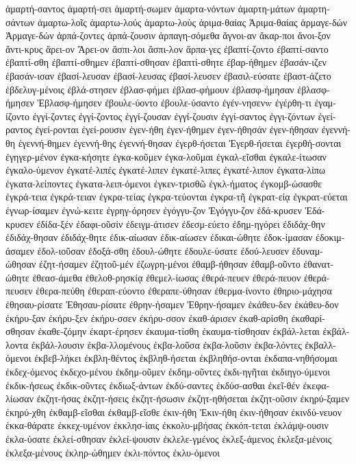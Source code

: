 {ἁμαρτή-σαντος
ἁμαρτή-σει
ἁμαρτή-σωμεν
ἁμαρτα-νόντων
ἁμαρτη-μάτων
ἁμαρτη-σάντων
ἁμαρτω-λοῖς
ἁμαρτω-λούς
ἁμαρτω-λοὺς
ἁριμα-θαίας
Ἁριμα-θαίας
ἁρμαγε-δών
Ἁρμαγε-δών
ἁρπά-ζοντες
ἁρπά-ζουσιν
ἁρπαγη-σόμεθα
ἄγνοι-αν
ἄκαρ-ποι
ἄνοι-ξον
ἄντι-κρυς
ἄρει-ον
Ἄρει-ον
ἄσπι-λοι
ἄσπι-λον
ἅρπα-γες
ἐβαπτί-ζοντο
ἐβαπτί-σαντο
ἐβαπτί-σθη
ἐβαπτί-σθημεν
ἐβαπτί-σθησαν
ἐβαπτί-σθητε
ἐβαρ-ήθημεν
ἐβασάν-ιζεν
ἐβασάν-ισαν
ἐβασί-λευσαν
ἐβασί-λευσας
ἐβασί-λευσεν
ἐβασιλ-εύσατε
ἐβαστ-άζετο
ἐβδελυγ-μένοις
ἐβλά-στησεν
ἐβλασ-φήμει
ἐβλασ-φήμουν
ἐβλασφ-ήμησαν
ἐβλασφ-ήμησεν
Ἐβλασφ-ήμησεν
ἐβουλε-ύοντο
ἐβουλε-ύσαντο
ἐγέν-νησενw
ἐγέρθη-τι
ἐγαμ-ίζοντο
ἐγγί-ζοντες
ἐγγί-ζοντος
ἐγγί-ζουσαν
ἐγγί-ζουσιν
ἐγγί-σαντος
ἐγγι-ζόντων
ἐγεί-ραντος
ἐγεί-ρονται
ἐγεί-ρουσιν
ἐγεν-ήθη
ἐγεν-ήθημεν
ἐγεν-ήθησάν
ἐγεν-ήθησαν
ἐγεννή-θη
ἐγεννή-θημεν
ἐγεννή-θης
ἐγεννή-θησαν
ἐγερθ-ήσεται
Ἐγερθ-ήσεται
ἐγερθή-σονται
ἐγηγερ-μένον
ἐγκα-κήσητε
ἐγκα-κοῦμεν
ἐγκα-λοῦμαι
ἐγκαλ-εῖσθαι
ἐγκαλε-ίτωσαν
ἐγκαλο-ύμενον
ἐγκατέ-λιπές
ἐγκατέ-λιπεν
ἐγκατέ-λιπες
ἐγκατέ-λιπον
ἐγκατα-λίπω
ἐγκατα-λείποντες
ἐγκατα-λειπ-όμενοι
ἐγκεν-τρισθῶ
ἐγκλ-ήματος
ἐγκομβ-ώσασθε
ἐγκρά-τεια
ἐγκρά-τειαν
ἐγκρα-τείας
ἐγκρα-τεύονται
ἐγκρα-τῆ
ἐγκρατ-είᾳ
ἐγκρατ-εύεται
ἐγνωρ-ίσαμεν
ἐγνώ-κειτε
ἐγρηγ-όρησεν
ἐγόγγυ-ζον
Ἐγόγγυ-ζον
ἐδά-κρυσεν
Ἐδά-κρυσεν
ἐδίδα-ξέν
ἐδαφι-οῦσίν
ἐδειγμ-άτισεν
ἐδεσμ-εύετο
ἐδημ-ηγόρει
ἐδιδάχ-θην
ἐδιδάχ-θησαν
ἐδιδάχ-θητε
ἐδικ-αίωσαν
ἐδικ-αίωσεν
ἐδικαι-ώθητε
ἐδοκ-ίμασαν
ἐδοκιμ-άσαμεν
ἐδολ-ιοῦσαν
ἐδοξά-σθη
ἐδουλ-ώθητε
ἐδουλε-ύσατε
ἐδού-λευσεν
ἐδυναμ-ώθησαν
ἐζητ-ήσαμεν
ἐζητοῦ-μέν
ἐζωγρη-μένοι
ἐθαμβ-ήθησαν
ἐθαμβ-οῦντο
ἐθανατ-ώθητε
ἐθεασ-άμεθα
ἐθελοθ-ρησκίᾳ
ἐθεμελ-ίωσας
ἐθερά-πευεν
ἐθερά-πευον
ἐθερά-πευσεν
ἐθερα-πεύθη
ἐθεραπ-εύοντο
ἐθεραπε-ύθησαν
ἐθερμα-ίνοντο
ἐθηριο-μάχησα
ἐθησαυ-ρίσατε
Ἐθησαυ-ρίσατε
ἐθρην-ήσαμεν
Ἐθρην-ήσαμεν
ἐκάθευ-δεν
ἐκάθευ-δον
ἐκήρυ-ξαν
ἐκήρυ-ξεν
ἐκήρυ-σσεν
ἐκήρυ-σσον
ἐκαθ-άρισεν
ἐκαθ-αρίσθη
ἐκαθαρί-σθησαν
ἐκαθε-ζόμην
ἐκαρτ-έρησεν
ἐκαυμα-τίσθη
ἐκαυμα-τίσθησαν
ἐκβάλ-λεται
ἐκβάλ-λοντα
ἐκβάλ-λουσιν
ἐκβα-λλομένους
ἐκβα-λοῦσα
ἐκβα-λοῦσιν
ἐκβα-λόντες
ἐκβαλλ-όμενοι
ἐκβεβ-λήκει
ἐκβλη-θέντος
ἐκβληθ-ήσεται
ἐκβληθήσ-ονται
ἐκδαπα-νηθήσομαι
ἐκδεχ-όμενος
ἐκδεχο-μένου
ἐκδημ-οῦμεν
ἐκδημ-οῦντες
ἐκδι-ηγῆται
ἐκδιηγο-ύμενοι
ἐκδικ-ήσεως
ἐκδικ-οῦντες
ἐκδιωξ-άντων
ἐκδύ-σαντες
ἐκδύσ-ασθαι
ἐκεῖ-θέν
ἐκεφα-λίωσαν
ἐκζητ-ήσας
ἐκζητ-ήσεις
ἐκζητ-ήσωσιν
ἐκζητ-ηθήσεται
ἐκζητ-οῦσιν
ἐκηρύ-ξαμεν
ἐκηρύ-χθη
ἐκθαμβ-εῖσθαι
ἐκθαμβ-εῖσθε
ἐκιν-ήθη
Ἐκιν-ήθη
ἐκιν-ήθησαν
ἐκινδύ-νευον
ἐκκα-θάρατε
ἐκκεχ-υμένον
ἐκκλησ-ίαις
ἐκκολυ-μβήσας
ἐκκόπ-τεται
ἐκλάμψ-ουσιν
ἐκλα-ύσατε
ἐκλεί-σθησαν
ἐκλεί-ψουσιν
ἐκλελε-γμένος
ἐκλεξ-άμενος
ἐκλεξα-μένοις
ἐκλεξα-μένους
ἐκληρ-ώθημεν
ἐκλι-πόντος
ἐκλυ-όμενοι
}
